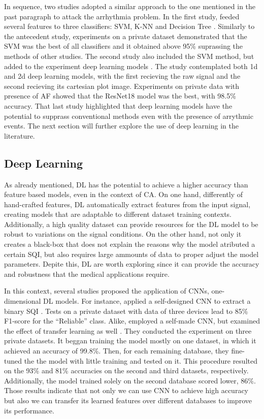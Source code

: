 In sequence, two studies adopted a similar approach to the one mentioned in the past paragraph to attack the arrhythmia problem. In the first study, \citeauthor{arrhythmia-3} feeded several features to three classifiers: \gls{SVM}, \gls{K-NN} and Decision Tree \cite{arrhythmia-3}. Similarly to the antecedent study, experiments on a private dataset demonstrated that the \gls{SVM} was the best of all classifiers and it obtained above 95\% suprassing the methods of other studies. The second study also included the \gls{SVM} method, but added to the experiment deep learning models \cite{arrhythmia-4}. The study contemplated both 1d and 2d deep learning models, with the first recieving the raw signal and the second recieving its cartesian plot image. Experiments on private data with presence of \gls{AF} showed that the ResNet18 model was the best, with 98.5\% accuracy. That last study highlighted that deep learning models have the potential to supprass conventional methods even with the presence of arrythmic events. The next section will further explore the use of deep learning in the literature.  

\subsection{Deep Learning}
\label{sec:deep_learning}

As already mentioned, \gls{DL} has the potential to achieve a higher accuracy than feature based models, even in the context of \gls{CA}. On one hand, differently of hand-crafted features, \gls{DL} automatically extract features from the input signal, creating models that are adaptable to different dataset training contexts. Additionally, a high quality dataset can provide resources for the \gls{DL} model to be robust to variations on the signal conditions. On the other hand, not only it creates a black-box that does not explain the reasons why the model atributed a certain \gls{SQI}, but also requires large ammounts of data to proper adjust the model parameters. Depite this, \gls{DL} are worth exploring since it can provide the accuracy and robustness that the medical applications require. 

In this context, several studies proposed the application of \gls{CNN}s, one-dimensional \gls{DL} models. For instance, \citeauthor{review-8} applied a self-designed \gls{CNN} to extract a binary \gls{SQI} \cite{review-8}. Tests on a private dataset with data of three devices lead to 85\% F1-score for the ``Reliable'' class. Alike, \citeauthor{review-9} employed a self-made \gls{CNN}, but examined the effect of transfer learning as well \cite{review-9}. They conducted the experiment on three private datasets. It beggan training the model mostly on one dataset, in which it achieved an accuracy of 99.8\%. Then, for each remaining database, they fine-tuned the the model with little training and tested on it. This procedure resulted on the 93\% and 81\% accuracies on the second and third datasets, respectively. Additionally, the model trained solely on the second database scored lower, 86\%. Those results indicate that not only we can use \gls{CNN} to achieve high accuracy but also we can transfer its learned features over different databases to improve its performance.

